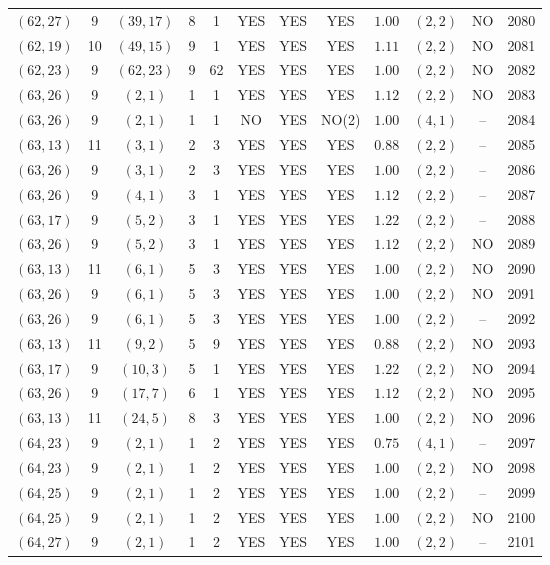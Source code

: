 \begin{longtable}{|c|c|c|c|c|c|c|c|c|c|c|c|}
$(62,27)$ & 9 & $(39,17)$ & 8 & 1 & YES & YES & YES & $1.00$ & $(2,2)$ & NO & 2080\\
$(62,19)$ & 10 & $(49,15)$ & 9 & 1 & YES & YES & YES & $1.11$ & $(2,2)$ & NO & 2081\\
$(62,23)$ & 9 & $(62,23)$ & 9 & 62 & YES & YES & YES & $1.00$ & $(2,2)$ & NO & 2082\\
$(63,26)$ & 9 & $(2,1)$ & 1 & 1 & YES & YES & YES & $1.12$ & $(2,2)$ & NO & 2083\\
$(63,26)$ & 9 & $(2,1)$ & 1 & 1 & NO & YES & NO(2) & $1.00$ & $(4,1)$ & -- & 2084\\
$(63,13)$ & 11 & $(3,1)$ & 2 & 3 & YES & YES & YES & $0.88$ & $(2,2)$ & -- & 2085\\
$(63,26)$ & 9 & $(3,1)$ & 2 & 3 & YES & YES & YES & $1.00$ & $(2,2)$ & -- & 2086\\
$(63,26)$ & 9 & $(4,1)$ & 3 & 1 & YES & YES & YES & $1.12$ & $(2,2)$ & -- & 2087\\
$(63,17)$ & 9 & $(5,2)$ & 3 & 1 & YES & YES & YES & $1.22$ & $(2,2)$ & -- & 2088\\
$(63,26)$ & 9 & $(5,2)$ & 3 & 1 & YES & YES & YES & $1.12$ & $(2,2)$ & NO & 2089\\
$(63,13)$ & 11 & $(6,1)$ & 5 & 3 & YES & YES & YES & $1.00$ & $(2,2)$ & NO & 2090\\
$(63,26)$ & 9 & $(6,1)$ & 5 & 3 & YES & YES & YES & $1.00$ & $(2,2)$ & NO & 2091\\
$(63,26)$ & 9 & $(6,1)$ & 5 & 3 & YES & YES & YES & $1.00$ & $(2,2)$ & -- & 2092\\
$(63,13)$ & 11 & $(9,2)$ & 5 & 9 & YES & YES & YES & $0.88$ & $(2,2)$ & NO & 2093\\
$(63,17)$ & 9 & $(10,3)$ & 5 & 1 & YES & YES & YES & $1.22$ & $(2,2)$ & NO & 2094\\
$(63,26)$ & 9 & $(17,7)$ & 6 & 1 & YES & YES & YES & $1.12$ & $(2,2)$ & NO & 2095\\
$(63,13)$ & 11 & $(24,5)$ & 8 & 3 & YES & YES & YES & $1.00$ & $(2,2)$ & NO & 2096\\
$(64,23)$ & 9 & $(2,1)$ & 1 & 2 & YES & YES & YES & $0.75$ & $(4,1)$ & -- & 2097\\
$(64,23)$ & 9 & $(2,1)$ & 1 & 2 & YES & YES & YES & $1.00$ & $(2,2)$ & NO & 2098\\
$(64,25)$ & 9 & $(2,1)$ & 1 & 2 & YES & YES & YES & $1.00$ & $(2,2)$ & -- & 2099\\
$(64,25)$ & 9 & $(2,1)$ & 1 & 2 & YES & YES & YES & $1.00$ & $(2,2)$ & NO & 2100\\
$(64,27)$ & 9 & $(2,1)$ & 1 & 2 & YES & YES & YES & $1.00$ & $(2,2)$ & -- & 2101\\

\end{longtable}
